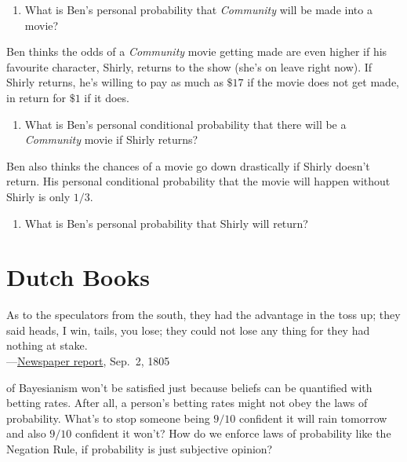\documentclass[justified]{tufte-book}
\providecommand{\tightlist}{%
  \setlength{\itemsep}{0pt}\setlength{\parskip}{0pt}}
\newenvironment{epigraph}%
{
\begin{flushright}    
\begin{minipage}{20em}
\begin{flushright}
\itshape
}%
{
\end{flushright}
\end{minipage}
\end{flushright}
}
\theoremstyle{definition}
\theoremstyle{definition}
\theoremstyle{definition}
\theoremstyle{remark}
\begin{document}
\begin{enumerate}
  \begin{enumerate}
  \def\labelenumii{\alph{enumii}.}
  \tightlist
  \item
    What is Ben's personal probability that \emph{Community} will be made into a movie?
  \end{enumerate}

  Ben thinks the odds of a \emph{Community} movie getting made are even higher if his favourite character, Shirly, returns to the show (she's on leave right now). If Shirly returns, he's willing to pay as much as \(\$17\) if the movie does not get made, in return for \(\$1\) if it does.

  \begin{enumerate}
  \def\labelenumii{\alph{enumii}.}
  \setcounter{enumii}{1}
  \tightlist
  \item
    What is Ben's personal conditional probability that there will be a \emph{Community} movie if Shirly returns?
  \end{enumerate}

  Ben also thinks the chances of a movie go down drastically if Shirly doesn't return. His personal conditional probability that the movie will happen without Shirly is only \(1/3\).

  \begin{enumerate}
  \def\labelenumii{\alph{enumii}.}
  \setcounter{enumii}{3}
  \tightlist
  \item
    What is Ben's personal probability that Shirly will return?
  \end{enumerate}
\end{enumerate}

\hypertarget{dutch-books}{%
\chapter{Dutch Books}\label{dutch-books}}

\begin{epigraph}
As to the speculators from the south, they had the advantage in the toss
up; they said heads, I win, tails, you lose; they could not lose any
thing for they had nothing at stake.\\
---\href{https://chroniclingamerica.loc.gov/lccn/sn83045242/1805-09-02/ed-1/seq-2.pdf}{Newspaper
report}, Sep.~2, 1805
\end{epigraph}

 of Bayesianism won't be satisfied just because beliefs can be quantified with betting rates. After all, a person's betting rates might not obey the laws of probability. What's to stop someone being \(9/10\) confident it will rain tomorrow and also \(9/10\) confident it won't? How do we enforce laws of probability like the Negation Rule, if probability is just subjective opinion?
\end{document}
